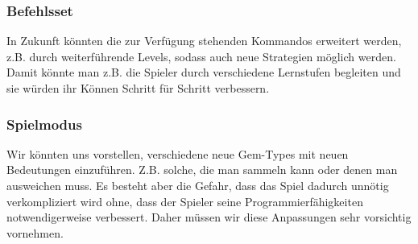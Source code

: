 \documentclass[11pt,a4paper,titlepage]{article}
\begin{document}
\subsubsection{Befehlsset}
In Zukunft könnten die zur Verfügung stehenden Kommandos erweitert werden, z.B. durch weiterführende Levels, sodass auch neue Strategien möglich werden. Damit könnte man z.B. die Spieler durch verschiedene Lernstufen begleiten und sie würden ihr Können Schritt für Schritt verbessern.

\subsubsection{Spielmodus}
Wir könnten uns vorstellen, verschiedene neue Gem-Types mit neuen Bedeutungen einzuführen. Z.B. solche, die man sammeln kann oder denen man ausweichen muss. Es besteht aber die Gefahr, dass das Spiel dadurch unnötig verkompliziert wird ohne, dass der Spieler seine Programmierfähigkeiten notwendigerweise verbessert. Daher müssen wir diese Anpassungen sehr vorsichtig vornehmen.

\newpage



\begin{otherlanguage}{german}
\printbibliography
\end{otherlanguage}

\begin{otherlanguage}{german}
\listoffigures
\end{otherlanguage}
\end{document}
